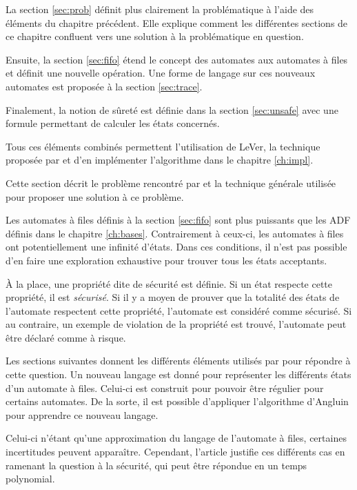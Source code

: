 La section \ref{sec:prob} définit plus clairement la problématique à l'aide des éléments du chapitre précédent. Elle explique comment les différentes sections de ce chapitre confluent vers une solution à la problématique en question.

Ensuite, la section \ref{sec:fifo} étend le concept des automates aux automates à files et définit une nouvelle opération. Une forme de langage sur ces nouveaux automates est proposée à la section \ref{sec:trace}.

Finalement, la notion de sûreté est définie dans la section \ref{sec:unsafe} avec une formule permettant de calculer les états concernés.

Tous ces éléments combinés permettent l'utilisation de LeVer, la technique proposée par \cite{Vardhan04} et d'en implémenter l'algorithme dans le chapitre \ref{ch:impl}.



Cette section décrit le problème rencontré par \cite{Vardhan04} et la technique générale utilisée pour proposer une solution à ce problème.

Les automates à files définis à la section \ref{sec:fifo} sont plus puissants que les ADF définis dans le chapitre \ref{ch:bases}. Contrairement à ceux-ci, les automates à files ont potentiellement une infinité d'états. Dans ces conditions, il n'est pas possible d'en faire une exploration exhaustive pour trouver tous les états acceptants.

À la place, une propriété dite de sécurité est définie. Si un état respecte cette propriété, il est \emph{sécurisé}. Si il y a moyen de prouver que la totalité des états de l'automate respectent cette propriété, l'automate est considéré comme sécurisé. Si au contraire, un exemple de violation de la propriété est trouvé, l'automate peut être déclaré comme à risque.

Les sections suivantes donnent les différents éléments utilisés par \cite{Vardhan04} pour répondre à cette question. Un nouveau langage est donné pour représenter les différents états d'un automate à files. Celui-ci est construit pour pouvoir être régulier pour certains automates. De la sorte, il est possible d'appliquer l'algorithme d'Angluin pour apprendre ce nouveau langage.

Celui-ci n'étant qu'une approximation du langage de l'automate à files, certaines incertitudes peuvent apparaître. Cependant, l'article justifie ces différents cas en ramenant la question à la sécurité, qui peut être répondue en un temps polynomial.

